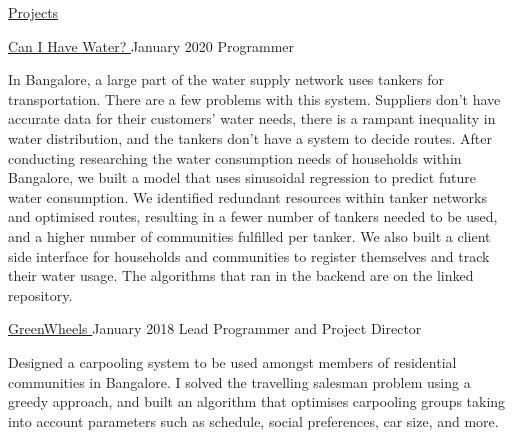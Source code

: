\documentclass{resume} %
\begin{document}
\begin{rSection}{\href{ https://www.nitvishn.net/\#/projects }{Projects}}
    
        \begin{rSubsection}{ 
             \href{ https: //github.com/nitvishn/water/ }{ Can I Have Water? } 
            }{ 
             January 2020 
             }{  Programmer  }
        \item In Bangalore, a large part of the water supply network uses tankers for transportation. There are a few problems with this system. Suppliers don’t have accurate data for their customers’ water needs, there is a rampant inequality in water distribution, and the tankers don't have a system to decide routes. After conducting researching the water consumption needs of households within Bangalore, we built a model that uses sinusoidal regression to predict future water consumption. We identified redundant resources within tanker networks and optimised routes, resulting in a fewer number of tankers needed to be used, and a higher number of communities fulfilled per tanker. We also built a client side interface for households and communities to register themselves and track their water usage. The algorithms that ran in the backend are on the linked repository.
        \end{rSubsection}
    

    
        \begin{rSubsection}{ 
             \href{ https://github.com/nitvishn/CarPooling/ }{ GreenWheels } 
            }{ 
             January 2018 
             }{  Lead Programmer and Project Director  }
        \item Designed a carpooling system to be used amongst members of residential communities in Bangalore. I solved the travelling salesman problem using a greedy approach, and built an algorithm that optimises carpooling groups taking into account parameters such as schedule, social preferences, car size, and more.
        \end{rSubsection}
    

    

    

    

    

    

    

    

    

    

    

    

    

    

    

\end{rSection}
\end{document}
